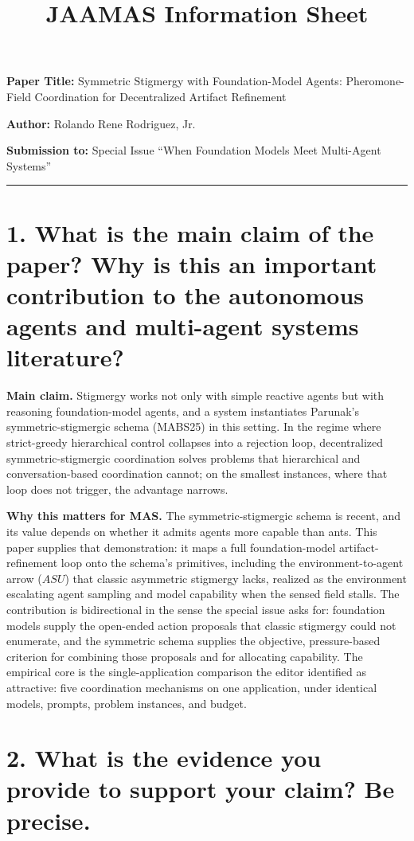 \documentclass[11pt]{article}
\title{JAAMAS Information Sheet}
\author{}
\date{}
\begin{document}
\noindent\textbf{Paper Title:} Symmetric Stigmergy with Foundation-Model Agents: Pheromone-Field Coordination for Decentralized Artifact Refinement

\noindent\textbf{Author:} Rolando Rene Rodriguez, Jr.

\noindent\textbf{Submission to:} Special Issue ``When Foundation Models Meet Multi-Agent Systems''

\vspace{1em}
\hrule
\vspace{1em}

\section*{1. What is the main claim of the paper? Why is this an important contribution to the autonomous agents and multi-agent systems literature?}

\textbf{Main claim.} Stigmergy works not only with simple reactive agents but with reasoning foundation-model agents, and a system instantiates Parunak's symmetric-stigmergic schema (MABS25) in this setting. In the regime where strict-greedy hierarchical control collapses into a rejection loop, decentralized symmetric-stigmergic coordination solves problems that hierarchical and conversation-based coordination cannot; on the smallest instances, where that loop does not trigger, the advantage narrows.

\textbf{Why this matters for MAS.} The symmetric-stigmergic schema is recent, and its value depends on whether it admits agents more capable than ants. This paper supplies that demonstration: it maps a full foundation-model artifact-refinement loop onto the schema's primitives, including the environment-to-agent arrow ($ASU$) that classic asymmetric stigmergy lacks, realized as the environment escalating agent sampling and model capability when the sensed field stalls. The contribution is bidirectional in the sense the special issue asks for: foundation models supply the open-ended action proposals that classic stigmergy could not enumerate, and the symmetric schema supplies the objective, pressure-based criterion for combining those proposals and for allocating capability. The empirical core is the single-application comparison the editor identified as attractive: five coordination mechanisms on one application, under identical models, prompts, problem instances, and budget.

\section*{2. What is the evidence you provide to support your claim? Be precise.}
\end{document}
